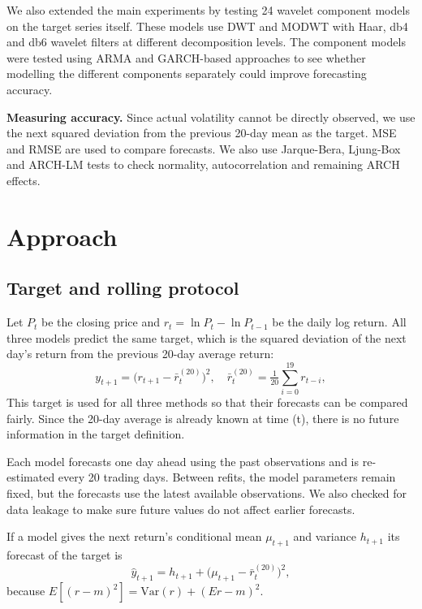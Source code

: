 \documentclass{article}
\begin{document}
We also extended the main experiments by testing 24 wavelet component models on the target series itself. These models use DWT and MODWT with Haar, db4 and db6 wavelet filters at different decomposition levels. The component models were tested using ARMA and GARCH-based approaches to see whether modelling the different components separately could improve forecasting accuracy.

\textbf{Measuring accuracy.} Since actual volatility cannot be directly observed, we use the next squared deviation from the previous 20-day mean as the target. MSE and RMSE are used to compare forecasts. We also use Jarque-Bera, Ljung-Box and ARCH-LM tests to check normality, autocorrelation and remaining ARCH effects.

\section{Approach}
\label{sec:approach}

\subsection{Target and rolling protocol}

Let $P_t$ be the closing price and $r_t=\ln P_t-\ln P_{t-1}$ be the daily log return. All three models predict the same target, which is the squared deviation of the next day's return from the previous 20-day average return:
\begin{equation}
y_{t+1}=\bigl(r_{t+1}-\bar r_{t}^{(20)}\bigr)^2,\quad \bar r_t^{(20)}=\tfrac{1}{20}\textstyle\sum_{i=0}^{19}r_{t-i},
\label{eq:target}
\end{equation}
This target is used for all three methods so that their forecasts can be compared fairly. Since the 20-day average is already known at time (t), there is no future information in the target definition.

Each model forecasts one day ahead using the past observations and is re-estimated every 20 trading days. Between refits, the model parameters remain fixed, but the forecasts use the latest available observations. We also checked for data leakage to make sure future values do not affect earlier forecasts.

If a model gives the next return's conditional mean  $\mu_{t+1}$ and variance $h_{t+1}$  its forecast of the target is
\begin{equation}
\hat y_{t+1}=h_{t+1}+\bigl(\mu_{t+1}-\bar r_t^{(20)}\bigr)^2 ,
\label{eq:restore}
\end{equation}
because $E[(r-m)^2]=\mathrm{Var}(r)+(E r-m)^2$.
\end{document}
